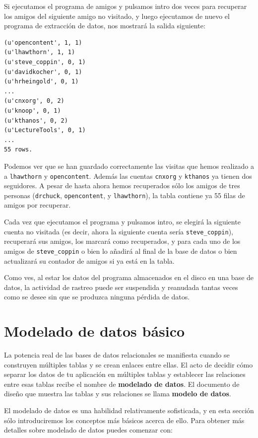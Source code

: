 Si ejecutamos el programa de amigos y pulsamos intro dos veces para recuperar
los amigos del siguiente amigo no visitado,
y luego ejecutamos de nuevo el programa de extracción de datos, nos mostrará la
salida siguiente: 

\beforeverb
\begin{verbatim}
(u'opencontent', 1, 1)
(u'lhawthorn', 1, 1)
(u'steve_coppin', 0, 1)
(u'davidkocher', 0, 1)
(u'hrheingold', 0, 1)
...
(u'cnxorg', 0, 2)
(u'knoop', 0, 1)
(u'kthanos', 0, 2)
(u'LectureTools', 0, 1)
...
55 rows.
\end{verbatim}
\afterverb
%
Podemos ver que se han guardado correctamente las visitas que hemos realizado a
a {\tt lhawthorn} y {\tt opencontent}. Además las cuentas
{\tt cnxorg} y {\tt kthanos} ya tienen dos seguidores.
A pesar de hasta ahora hemos recuperados sólo los amigos de tres personas
({\tt drchuck}, {\tt opencontent}, y {\tt lhawthorn}), la tabla contiene ya
55 filas de amigos por recuperar.

Cada vez que ejecutamos el programa y pulsamos intro, se elegirá la siguiente
cuenta no visitada (es decir, ahora la siguiente cuenta sería \verb"steve_coppin"),
recuperará sus amigos, los marcará como recuperados, y para cada uno de los
amigos de \verb"steve_coppin" o bien lo añadirá al final de la
base de datos o bien actualizará su contador de amigos si ya está en la
tabla.

Como ves, al estar los datos del programa almacenados en el disco en una base de datos,
la actividad de rastreo puede ser suspendida y reanudada tantas veces como se desee
sin que se produzca ninguna pérdida de datos.

\section{Modelado de datos básico}

La potencia real de las bases de datos relacionales se manifiesta cuando se construyen múltiples
tablas y se crean enlaces entre ellas. El acto de decidir cómo separar los datos de tu
aplicación en múltiples tablas y establecer las relaciones
entre esas tablas recibe el nombre de {\bf modelado de datos}. El
documento de diseño que muestra las tablas y sus relaciones
se llama {\bf modelo de datos}.

El modelado de datos es una habilidad relativamente sofisticada, y en esta sección sólo
introduciremos los conceptos más básicos acerca de ello. Para obtener más
detalles sobre modelado de datos puedes comenzar con:

